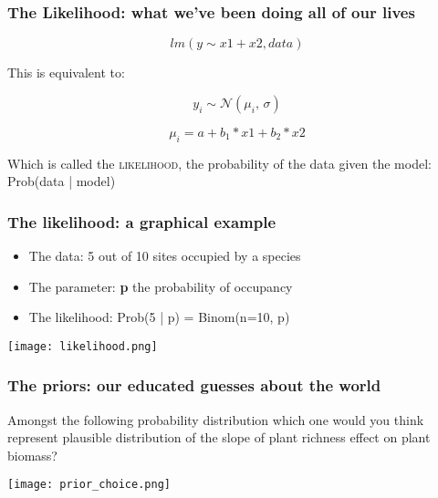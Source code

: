 \documentclass{beamer}
\begin{document}
 
 \begin{frame}
  \frametitle{\bf The Likelihood: what we've been doing all of our lives}
  
 \[
  lm(y \sim x1 + x2, data)
 \]

  
  This is equivalent to:
  
  \[
   y_i \sim \mathcal{N}(\mu_i,\, \sigma)   
   \]
   
   \[
    \mu_i = a + b_1 * x1 + b_2 * x2
   \]

Which is called the \textsc{likelihood}, the probability of the data given the model: Prob(data | model) 
   
  
  
 \end{frame}
 
 \begin{frame}
  \frametitle{\bf The likelihood: a graphical example}
  
  \begin{itemize}
   \item The data: 5 out of 10 sites occupied by a species
   \item The parameter: \textbf{p} the probability of occupancy
   \item The likelihood: Prob(5 | p) = Binom(n=10, p)
  \end{itemize}

  
  \texttt{[image: likelihood.png]}
  

  
 \end{frame}

 \begin{frame}
  \frametitle{\bf The priors: our educated guesses about the world}
  
  Amongst the following probability distribution which one would you think represent plausible distribution of the slope of plant richness effect on plant biomass?
  
  \texttt{[image: prior\_choice.png]}
  
  
 \end{frame}
 
\end{document}
